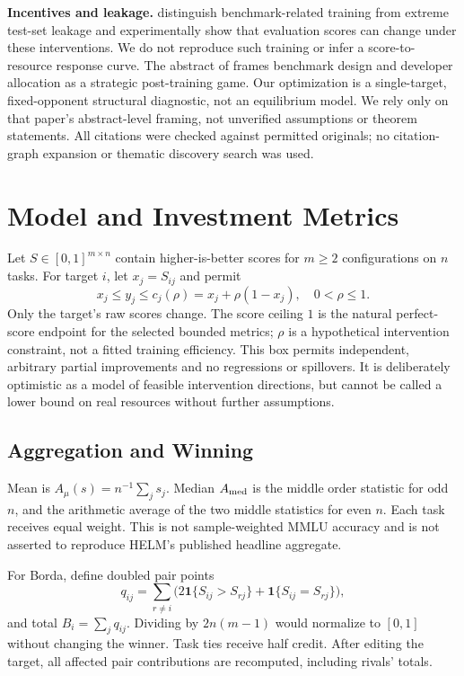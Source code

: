 \documentclass{article}
\newcommand{\ind}{\mathbf{1}}
\begin{document}
\textbf{Incentives and leakage.} \citet{zhou2023benchmarkcheater} distinguish benchmark-related training from extreme test-set leakage and experimentally show that evaluation scores can change under these interventions. We do not reproduce such training or infer a score-to-resource response curve. The abstract of \citet{chen2026leaderboard} frames benchmark design and developer allocation as a strategic post-training game. Our optimization is a single-target, fixed-opponent structural diagnostic, not an equilibrium model. We rely only on that paper's abstract-level framing, not unverified assumptions or theorem statements. All citations were checked against permitted originals; no citation-graph expansion or thematic discovery search was used.

\section{Model and Investment Metrics}
Let $S\in[0,1]^{m\times n}$ contain higher-is-better scores for $m\ge2$ configurations on $n$ tasks. For target $i$, let $x_j=S_{ij}$ and permit
\begin{equation}
 x_j\le y_j\le c_j(\rho)=x_j+\rho(1-x_j),\quad 0<\rho\le1.
 \label{eq:ceiling}
\end{equation}
Only the target's raw scores change. The score ceiling $1$ is the natural perfect-score endpoint for the selected bounded metrics; $\rho$ is a hypothetical intervention constraint, not a fitted training efficiency. This box permits independent, arbitrary partial improvements and no regressions or spillovers. It is deliberately optimistic as a model of feasible intervention directions, but cannot be called a lower bound on real resources without further assumptions.

\subsection{Aggregation and Winning}
Mean is $A_\mu(s)=n^{-1}\sum_j s_j$. Median $A_{\rm med}$ is the middle order statistic for odd $n$, and the arithmetic average of the two middle statistics for even $n$. Each task receives equal weight. This is not sample-weighted MMLU accuracy and is not asserted to reproduce HELM's published headline aggregate.

For Borda, define doubled pair points
\begin{equation}
 q_{ij}=\sum_{r\ne i}\big(2\ind\{S_{ij}>S_{rj}\}+\ind\{S_{ij}=S_{rj}\}\big),
 \label{eq:borda}
\end{equation}
and total $B_i=\sum_jq_{ij}$. Dividing by $2n(m-1)$ would normalize to $[0,1]$ without changing the winner. Task ties receive half credit. After editing the target, all affected pair contributions are recomputed, including rivals' totals.
\end{document}

